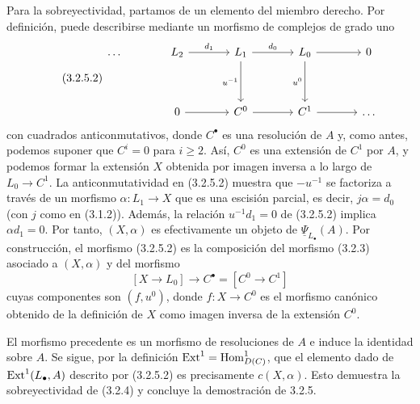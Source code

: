Para la sobreyectividad, partamos de un elemento del miembro derecho.
Por definición, puede describirse mediante un morfismo de complejos de
grado uno
\begin{equation}\tag{3.2.5.2}
\begin{tikzcd}[column sep=large,row sep=huge]
 \ldots & L_2\arrow[r,"d_1"]
 & L_1\arrow[r,"d_0"]\arrow[d,"u^{-1}"']
 & L_0\arrow[r]\arrow[d,"u^0"'] & 0\\
 & 0\arrow[r] & C^0\arrow[r] & C^1\arrow[r] & \ldots
\end{tikzcd}
\end{equation}
con cuadrados anticonmutativos, donde $C^\bullet$ es una resolución de
$A$ y, como antes, podemos suponer que $C^i=0$ para $i\geq2$. Así,
$C^0$ es una extensión de $C^1$ por $A$, y podemos formar la extensión
$X$ obtenida por imagen inversa a lo largo de
$L_0\longrightarrow C^1$. La anticonmutatividad en (3.2.5.2) muestra
que $-u^{-1}$ se factoriza a través de un morfismo
$\alpha:L_1\longrightarrow X$ que es una escisión parcial, es decir,
$j\alpha=d_0$ (con $j$ como en (3.1.2)). Además, la relación
$u^{-1}d_1=0$ de (3.2.5.2) implica $\alpha d_1=0$. Por tanto,
$(X,\alpha)$ es efectivamente un objeto de
$\underline\Psi_{L_\bullet}(A)$. Por construcción, el morfismo
(3.2.5.2) es la composición del morfismo (3.2.3) asociado a
$(X,\alpha)$ y del morfismo
\[
 [X\longrightarrow L_0]\longrightarrow C^\bullet
 =[C^0\longrightarrow C^1]
\]
cuyas componentes son $(f,u^0)$, donde $f:X\longrightarrow C^0$ es el
morfismo canónico obtenido de la definición de $X$ como imagen inversa
de la extensión $C^0$.

El morfismo precedente es un morfismo de resoluciones de $A$ e induce
la identidad sobre $A$. Se sigue, por la definición
$\operatorname{Ext}^1=\operatorname{Hom}^1_{D(C)}$, que el elemento dado de
$\operatorname{Ext}^1(L_\bullet,A)$ descrito por (3.2.5.2) es precisamente
$c(X,\alpha)$. Esto demuestra la sobreyectividad de (3.2.4) y concluye
la demostración de 3.2.5.
